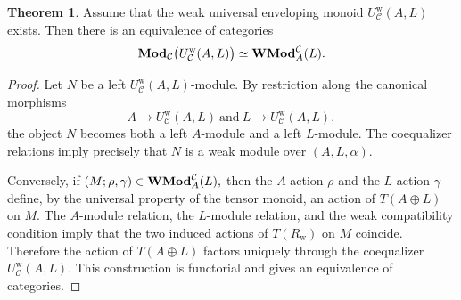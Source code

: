 \documentclass[11pt]{amsart}
\theoremstyle{definition}
\newtheorem{theor}[theo]{Theorem}
\numberwithin{equation}{section}
\begin{document}
\begin{theor}
Assume that the weak universal enveloping monoid $U^{\mathrm w}_{\mathcal C}(A,L)$
exists. Then there is an equivalence of categories
\[
{\bf Mod}_{\mathcal C}\big(U^{\mathrm w}_{\mathcal C}(A,L)\big)
\simeq
{\bf WMod}^{\mathcal C}_A(L).
\]
\end{theor}
\begin{proof}
Let $N$ be a left $U^{\mathrm w}_{\mathcal C}(A,L)$-module. By restriction
along the canonical morphisms
\[
A\rightarrow U^{\mathrm w}_{\mathcal C}(A,L) \ \text{and} \ 
L\rightarrow U^{\mathrm w}_{\mathcal C}(A,L),
\]
the object $N$ becomes both a left $A$-module and a left $L$-module. The
coequalizer relations imply precisely that $N$ is a weak module over $(A,L,\alpha)$.

Conversely, if $(M;\rho,\gamma)\in {\bf WMod}^{\mathcal C}_A(L),$
then the $A$-action $\rho$ and the $L$-action $\gamma$ define, by the
universal property of the tensor monoid, an action of $T(A\oplus L)$ on $M$.
The $A$-module relation, the $L$-module relation, and the weak compatibility
condition imply that the two induced actions of $T(R_{\mathrm w})$ on $M$
coincide. Therefore the action of $T(A\oplus L)$ factors uniquely through the coequalizer
$U^{\mathrm w}_{\mathcal C}(A,L).$
This construction is functorial and gives an equivalence of categories.
\end{proof}
\end{document}
